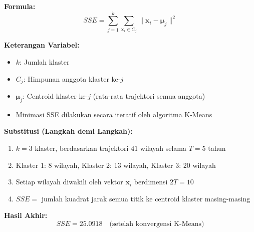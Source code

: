 \documentclass[11pt,a4paper]{article}
\begin{document}
\begin{tcolorbox}[formula_box, title={19. Fungsi Objektif K-Means (SSE)}]
\textbf{Formula:}
\[ SSE = \sum_{j=1}^{k} \sum_{\mathbf{x}_i \in C_j} \|\mathbf{x}_i - \boldsymbol{\mu}_j\|^2 \]

\textbf{Keterangan Variabel:}
\begin{itemize}
  \item $k$: Jumlah klaster
  \item $C_j$: Himpunan anggota klaster ke-$j$
  \item $\boldsymbol{\mu}_j$: Centroid klaster ke-$j$ (rata-rata trajektori semua anggota)
  \item Minimasi SSE dilakukan secara iteratif oleh algoritma K-Means
\end{itemize}

\textbf{Substitusi (Langkah demi Langkah):}
\begin{enumerate}
  \item $k = 3$ klaster, berdasarkan trajektori $41$ wilayah selama $T=5$ tahun
  \item Klaster 1: 8 wilayah, Klaster 2: 13 wilayah, Klaster 3: 20 wilayah
  \item Setiap wilayah diwakili oleh vektor $\mathbf{x}_i$ berdimensi $2T = 10$
  \item $SSE = $ jumlah kuadrat jarak semua titik ke centroid klaster masing-masing
\end{enumerate}

\textbf{Hasil Akhir:}
\[ SSE = 25.0918 \quad \text{(setelah konvergensi K-Means)} \]
\end{tcolorbox}
\end{document}
